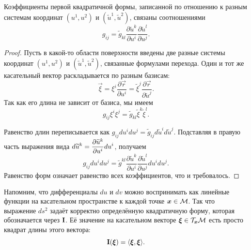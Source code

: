 \begin{proposition}
	Коэффициенты первой квадратичной формы, записанной по отношению к разным системам координат $(u^1, u^2)$ и $(\widetilde{u}^1, \widetilde{u}^2)$, связаны соотношениями\footnotemark
	\begin{equation} \label{eq:QTensorLaw}
		g_{ij} = \widetilde{g}_{kl}\frac{\partial\widetilde{u}^k}{\partial u^i}\frac{\partial \widetilde{u}^l}{\partial u^j}.
	\end{equation}
\end{proposition}


\begin{proof}
	Пусть в какой-то области поверхности введены две разные системы координат $(u^1, u^2)$ и $(\widetilde{u}^1, \widetilde{u}^2)$, связанные формулами перехода. Один и тот же касательный вектор раскладывается по разным базисам:
	\[
		\vec{\xi} = \xi^i\frac{\partial\vec{r}}{\partial u^i} = \widetilde{\xi}^j\frac{\partial\vec{r}}{\partial\widetilde{u}^j}.
	\]
	Так как его длина не зависит от базиса, мы имеем
	\[
		g_{ij}\xi^i\xi^j = \widetilde{g}_{kl}\widetilde{\xi}^k\widetilde{\xi}^l.
	\]

	Равенство длин переписывается как $g_{ij}du^idu^j = \widetilde{g}_{ij}d\widetilde{u}^id\widetilde{u}^j$. Подставляя в правую часть выражения вида $\displaystyle d\widetilde{u}^k = \frac{\partial\widetilde{u}^k}{\partial u^i}du^i$, получаем
	\[
		g_{ij}du^idu^j = \widetilde{g}^{kl}\frac{\partial\widetilde{u}^k}{\partial u^i}\frac{\partial\widetilde{u}^l}{\partial u^j}du^idu^j.
	\]
	Равенство форм означает равенство всех коэффициентов, что и требовалось.
\end{proof}

Напомним, что дифференциалы $du$ и $dv$ можно воспринимать как линейные функции на касательном пространстве к каждой точке $\boldsymbol{x} \in \mathcal{M}$. Так что выражение $ds^2$ задаёт корректно определённую квадратичную форму, которая обозначается через $\boldsymbol{\operatorname{I}}$. Её значение на касательном векторе $\boldsymbol{\xi} \in \mathcal{T}_{\boldsymbol{x}}\mathcal{M}$ есть просто квадрат длины этого вектора:
\[
	\boldsymbol{\operatorname{I}}(\boldsymbol{\xi}) = \langle\boldsymbol{\xi}, \boldsymbol{\xi}\rangle.
\]

